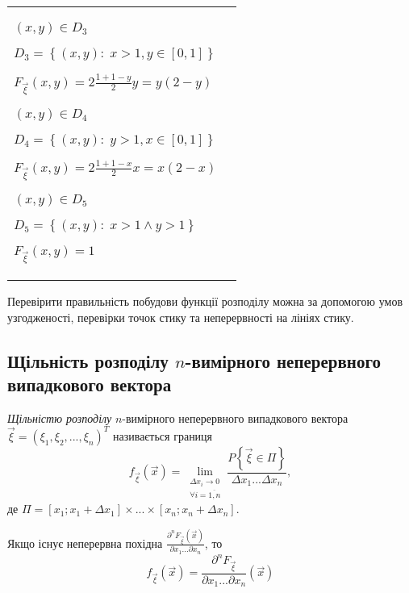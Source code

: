 \begin{example}
\begin{enumerate}
\begin{tabular}{p{6cm} p{6cm}}
            $(x, y) \in D_3$
            
            $D_3 = \left\{(x, y):\; x > 1,
            y \in \left[0, 1\right]\right\}$

            $F_{\vec{\xi}}(x, y) = 2\frac{1+1-y}{2}y = y(2-y)$
            
            \vspace{5mm}

            $(x, y) \in D_4$
            
            $D_4 = \left\{(x, y):\; y > 1,
            x \in \left[0, 1\right]\right\}$

            $F_{\vec{\xi}}(x, y) = 2\frac{1+1-x}{2}x = x(2-x)$
            
            \vspace{5mm}
            
            $(x, y) \in D_5$
            
            $D_5 = \left\{(x, y):\; x > 1 \land y > 1\right\}$

            $F_{\vec{\xi}}(x, y) = 1$\\
           
        \end{tabular}
    \end{enumerate}
\end{example}

\begin{remark}
    Перевірити правильність побудови функції розподілу можна за допомогою 
    умов узгодженості, перевірки точок стику та неперервності на лініях стику.
\end{remark}

\subsection{Щільність розподілу \texorpdfstring{$n$}{n}-вимірного неперервного випадкового 
вектора}
\begin{definition}
    \emph{Щільністю розподілу} $n$-вимірного неперервного випадкового 
    вектора $\vec{\xi} = \left(\xi_1, \xi_2, ..., \xi_n\right)^T$ називається границя
    \begin{equation}
        f_{\vec{\xi}} (\vec{x}) = \lim_{\substack{\Delta x_i \to 0 \\
        \forall i = \overline{1,n}}} 
        \frac{P\left\{\vec{\xi} \in \Pi\right\}}{\Delta x_1...\Delta x_n},
    \end{equation}
    де $\Pi = 
    \left[x_1; x_1+\Delta x_1\right] \times ... \times 
    \left[x_n; x_n+\Delta x_n\right]$.

    Якщо існує неперервна похідна $\frac{\partial^n F_{\vec{\xi}}(\vec{x})}
    {\partial x_1 ... \partial x_n}$, то
    \begin{equation}
        f_{\vec{\xi}} (\vec{x}) = \frac{\partial^n F_{\vec{\xi}}}
        {\partial x_1 ... \partial x_n}(\vec{x})
    \end{equation}
\end{definition}


